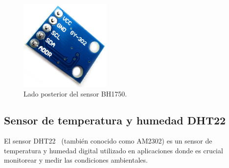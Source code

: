 \begin{figure}[h]
    \centering
    \includegraphics[width=0.4\textwidth]{img/herramientas/bh1750_reverso.png}
    \caption{Lado posterior del sensor BH1750.}
\end{figure}
\pagebreak

\subsection{Sensor de temperatura y humedad DHT22}
El sensor DHT22~\cite{manual:DHT22} (también conocido como AM2302) es un sensor de temperatura y humedad digital utilizado en aplicaciones donde es crucial monitorear y medir las condiciones ambientales.

